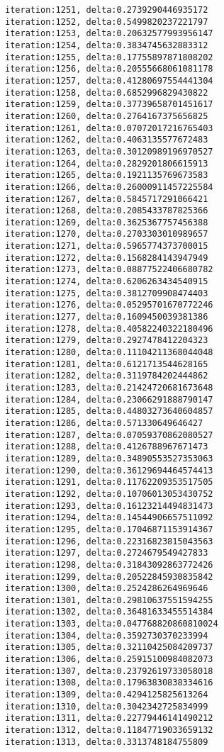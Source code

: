 \documentclass[11pt]{article}
\begin{document}
\begin{Verbatim}[commandchars=\\\{\}]
iteration:1251, delta:0.2739290446935172
iteration:1252, delta:0.5499820237221797
iteration:1253, delta:0.20632577993956147
iteration:1254, delta:0.3834745632883312
iteration:1255, delta:0.17755897871808202
iteration:1256, delta:0.20555668061081178
iteration:1257, delta:0.41280697554441304
iteration:1258, delta:0.6852996829430822
iteration:1259, delta:0.37739658701451617
iteration:1260, delta:0.2764167375656825
iteration:1261, delta:0.07072017216765403
iteration:1262, delta:0.4063135577672483
iteration:1263, delta:0.30120989196970527
iteration:1264, delta:0.2829201806615913
iteration:1265, delta:0.1921135769673583
iteration:1266, delta:0.26000911457225584
iteration:1267, delta:0.5845717291066421
iteration:1268, delta:0.2085433787825366
iteration:1269, delta:0.3625367757456388
iteration:1270, delta:0.2703303010989657
iteration:1271, delta:0.5965774373700015
iteration:1272, delta:0.1568284143947949
iteration:1273, delta:0.08877522406680782
iteration:1274, delta:0.6206263434540915
iteration:1275, delta:0.3812709908474403
iteration:1276, delta:0.05295701670772246
iteration:1277, delta:0.1609450039381386
iteration:1278, delta:0.40582240322180496
iteration:1279, delta:0.2927478412204323
iteration:1280, delta:0.11104211368044048
iteration:1281, delta:0.6121713544628165
iteration:1282, delta:0.3119784202444862
iteration:1283, delta:0.21424720681673648
iteration:1284, delta:0.23066291888790147
iteration:1285, delta:0.44803273640604857
iteration:1286, delta:0.571330649646427
iteration:1287, delta:0.07059370862080527
iteration:1288, delta:0.4126788967671473
iteration:1289, delta:0.34890553527353063
iteration:1290, delta:0.36129694464574413
iteration:1291, delta:0.11762209353517505
iteration:1292, delta:0.10706013053430752
iteration:1293, delta:0.16123214494831473
iteration:1294, delta:0.14544906657511092
iteration:1295, delta:0.17046871153914367
iteration:1296, delta:0.22316823815043563
iteration:1297, delta:0.2724679549427833
iteration:1298, delta:0.31843092863772426
iteration:1299, delta:0.20522845930835842
iteration:1300, delta:0.2524286264969646
iteration:1301, delta:0.29810637551594255
iteration:1302, delta:0.36481633455514384
iteration:1303, delta:0.047768820860810024
iteration:1304, delta:0.3592730370233994
iteration:1305, delta:0.32110425084209737
iteration:1306, delta:0.25915100984082073
iteration:1307, delta:0.23792619733058018
iteration:1308, delta:0.17963830838334616
iteration:1309, delta:0.4294125825613264
iteration:1310, delta:0.3042342725834999
iteration:1311, delta:0.22779446141490212
iteration:1312, delta:0.11847719033659132
iteration:1313, delta:0.3313748184755809

\end{Verbatim}
\end{document}
